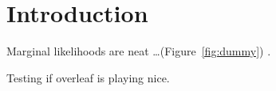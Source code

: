 \section{Introduction}

Marginal likelihoods are neat \ldots (Figure~\ref{fig:dummy}) \citep{Felsenstein1981}.

Testing if overleaf is playing nice.
